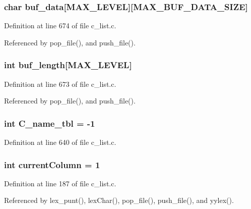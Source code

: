\subsubsection{\setlength{\rightskip}{0pt plus 5cm}char \bf{buf\_\-data}[MAX\_\-LEVEL][MAX\_\-BUF\_\-DATA\_\-SIZE]\hspace{0.3cm}{\tt  [static]}}\label{c__list_8c_50414304d4a5b66d7c4ddba8f391c50c}




Definition at line 674 of file c\_\-list.c.

Referenced by pop\_\-file(), and push\_\-file().
\subsubsection{\setlength{\rightskip}{0pt plus 5cm}int \bf{buf\_\-length}[MAX\_\-LEVEL]\hspace{0.3cm}{\tt  [static]}}\label{c__list_8c_e8d42ce06747828ebfe640b56d1bdf8d}




Definition at line 673 of file c\_\-list.c.

Referenced by pop\_\-file(), and push\_\-file().
\subsubsection{\setlength{\rightskip}{0pt plus 5cm}int \bf{C\_\-name\_\-tbl} = -1}\label{c__list_8c_446c74d493161a30bddec311a029bed1}




Definition at line 640 of file c\_\-list.c.
\subsubsection{\setlength{\rightskip}{0pt plus 5cm}int \bf{current\-Column} = 1\hspace{0.3cm}{\tt  [static]}}\label{c__list_8c_39f51540474a958458f646d347094c8b}




Definition at line 187 of file c\_\-list.c.

Referenced by lex\_\-punt(), lex\-Char(), pop\_\-file(), push\_\-file(), and yylex().
